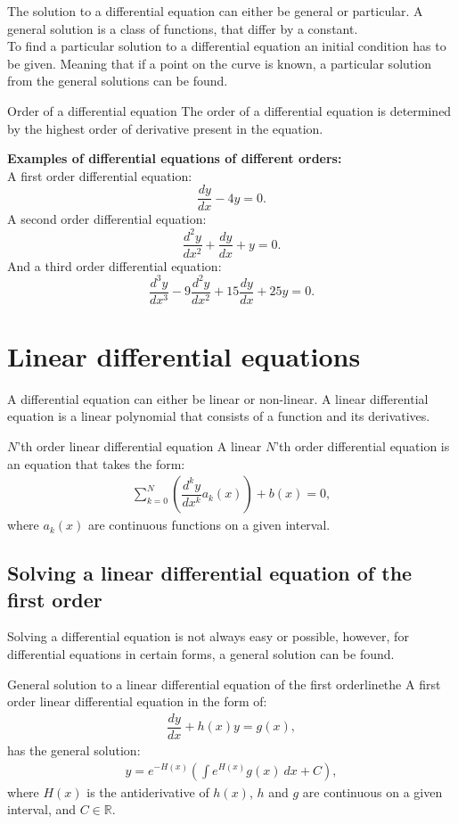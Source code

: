 \noindent The solution to a differential equation can either be general or particular. A general solution is a class of functions, that differ by a constant.
\\
To find a particular solution to a differential equation an initial condition has to be given. Meaning that if a point on the curve is known, a particular solution from the general solutions can be found.

\clearpage

\begin{definition}{Order of a differential equation}{}
The order of a differential equation is determined by the highest order of derivative present in the equation.
\end{definition} 

\noindent
\textbf{Examples of differential equations of different orders:}
\\
A first order differential equation:
$$\frac{dy}{dx}-4y=0. $$
A second order differential equation:
$$\frac{d^2y}{dx^2}+\frac{dy}{dx}+y = 0.$$
And a third order differential equation:
$$\frac{d^3y}{dx^3} - 9\frac{d^2y}{dx^2} + 15\frac{dy}{dx} + 25y = 0.$$

\section{Linear differential equations}
A differential equation can either be linear or non-linear. A linear differential equation is a linear polynomial that consists of a function and its derivatives.
\begin{definition}{$N$'th order linear differential equation}{}
A linear $N$'th order differential equation is an equation that takes the form:
\begin{align*}
\sum_{k=0}^{N}\left(\dfrac{d^ky}{dx^k}a_k(x)\right)+b(x)=0,
\end{align*}
where $a_k(x)$ are continuous functions on a given interval.
\end{definition}
\subsection{Solving a linear differential equation of the first order}
Solving  a differential equation is not always easy or possible, however, for differential equations in certain forms, a general solution can be found.

\begin{theorem}{General solution to a linear differential equation of the first order}{linethe}
A first order linear differential equation in the form of:
\begin{align} \label{FODE_form}
\dfrac{dy}{dx}+h(x)y=g(x),
\end{align}
has the general solution:
\begin{align} \label{FODE_solution}
y=e^{-H(x)}\left(\int e^{H(x)}g(x)\ dx+C\right),
\end{align}
where $H(x)$ is the antiderivative of $h(x)$, $h$ and $g$ are continuous on a given interval, and $C\in \mathbb{R}$.
\end{theorem}

